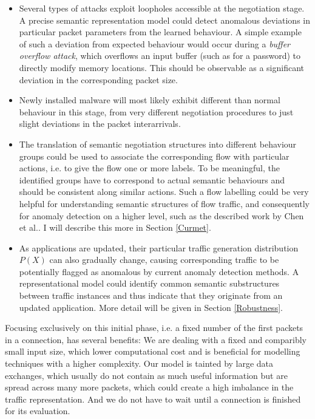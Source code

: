 \documentclass[a4paper,12pt,twoside]{report}
\begin{document}
\begin{itemize}
\item Several types of attacks exploit loopholes accessible at the negotiation stage. A precise semantic representation model could detect anomalous deviations in particular packet parameters from the learned behaviour. A simple example of such a deviation from expected behaviour would occur during a \textit{buffer overflow attack}, which overflows an input buffer (such as for a password) to directly modify memory locations. This should be observable as a significant deviation in the corresponding packet size.

\item Newly installed malware will most likely exhibit different than normal behaviour in this stage, from very different negotiation procedures to just slight deviations in the packet interarrivals.

\item The translation of semantic negotiation structures into different behaviour groups could be used to associate the corresponding flow with particular actions, i.e. to give the flow one or more labels. To be meaningful, the identified groups have to correspond to actual semantic behaviours and should be consistent along similar actions. 
Such a flow labelling could be very helpful for understanding semantic structures of flow traffic, and consequently for anomaly detection on a higher level, such as the described work by Chen et al.\cite{chen_more_2016}. I will describe this more in Section \ref{Curmet}.

\item As applications are updated, their particular traffic generation distribution $P(X)$ can also  gradually change, causing corresponding traffic to be potentially flagged as anomalous by current anomaly detection methods. A representational model could identify common semantic substructures between traffic instances and thus indicate that they originate from an updated application. More detail will be given in Section \ref{Robustness}.

\end{itemize}

Focusing exclusively on this initial phase, i.e. a fixed number of the first packets in a connection, has several benefits: We are dealing with a fixed and comparibly small input size, which lower computational cost and is beneficial for modelling techniques with a higher complexity. Our model is tainted by large data exchanges, which usually do not contain as much useful information but are spread across many more packets, which could create a high imbalance in the traffic representation. And we do not have to wait until a connection is finished for its evaluation.
\end{document}
